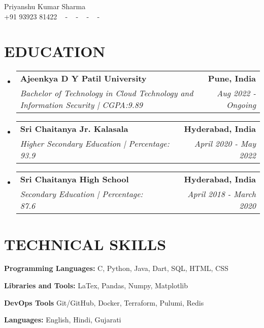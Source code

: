 \documentclass[letterpaper,11pt]{article}
\makeatletter
\newcommand{\resumeSubheading}[4]{
  \vspace{-2pt}\item
    \begin{tabular*}{1.0\textwidth}[t]{l@{\extracolsep{\fill}}r}
      \textbf{\large#1} & \textbf{\small #2} \\
      \textit{\large#3} & \textit{\small #4} \\
      
    \end{tabular*}\vspace{-7pt}
}
\newcommand{\resumeSubHeadingListStart}{\begin{itemize}[leftmargin=0.0in, label={}]}
\newcommand{\resumeSubHeadingListEnd}{\end{itemize}}
\makeatother
\begin{document}


\begin{center}
    {\huge Priyanshu Kumar Sharma} \\ \vspace{2pt} 
    {+91 93923 81422} ~ 
    \small{-}
    \href{priyanshu17ks@gmail.com}{\color{blue}{priyanshu17ks@gmail.com}} ~ 
    \small{-}
    \href{https://www.linkedin.com/in/priyanshu-kumar-sharma-333800251/}{ \color{blue}{Linked In}}  ~
    \small{-}
    \href{https://github.com/PriyanshuKSharma/}{ \color{blue}{GitHub}} ~
    \small{-}
    \href{https://hub.docker.com/u/priyanshuksharma}{\color{blue}{DockerHub}} ~
    \vspace{-7pt}
\end{center}

\section{\color{airforceblue}EDUCATION}
  \resumeSubHeadingListStart
    \resumeSubheading
      {Ajeenkya D Y Patil University}{Pune, India}
      {Bachelor of Technology in Cloud Technology and Information Security {| CGPA:9.89}}{Aug 2022 - Ongoing}
    \vspace{-4pt}
     \resumeSubheading
      {Sri Chaitanya Jr. Kalasala}{Hyderabad, India}
      {Higher Secondary Education {| Percentage: 93.9}}{April 2020 - May 2022}
    \vspace{-4pt}
     \resumeSubheading
      {Sri Chaitanya High School}{Hyderabad, India}
      {Secondary Education {| Percentage: 87.6}}{April 2018 - March 2020}

    
  \resumeSubHeadingListEnd
  \vspace{-10pt}

\section{\color{airforceblue}TECHNICAL SKILLS}
 \begin{itemize}[leftmargin=0in, label={}]
    \small{\item{
     \textbf{\normalsize{Programming Languages:}}{ \normalsize{C, Python, Java, Dart, SQL, HTML, CSS}} \\
      \vspace{1.8pt}
      
     \textbf{\normalsize{Libraries and Tools:}}{ \normalsize{LaTex,  Pandas, Numpy, Matplotlib}} \\
      \vspace{1.8pt}

      \textbf{\normalsize{DevOps Tools}}{ \normalsize{Git/GitHub, Docker, Terraform, Pulumi, Redis}} \\
      \vspace{1.8pt}
      
     \textbf{\normalsize{Languages:}}{ \normalsize{English, Hindi, Gujarati}}

     }}
 \end{itemize}
 \vspace{-16pt}
 
\end{document}
